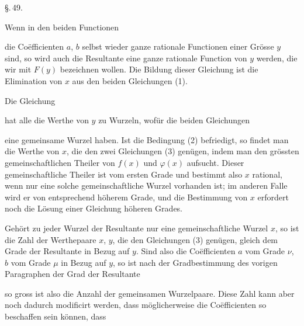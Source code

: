 
\begin{center}
\S.\,49.

\end{center}

Wenn in den beiden Functionen


die Coëfficienten $a$, $b$ selbst wieder ganze rationale Functionen
einer Grösse $y$ sind, so wird auch die Resultante eine ganze
rationale Function von $y$ werden, die wir mit $F(y)$ bezeichnen
wollen. Die Bildung dieser Gleichung ist die Elimination von
$x$ aus den beiden Gleichungen (1).

Die Gleichung


hat alle die Werthe von $y$ zu Wurzeln, wofür die beiden
Gleichungen


eine gemeinsame Wurzel haben. Ist die Bedingung (2) befriedigt,
so findet man die Werthe von $x$, die den zwei Gleichungen
(3) genügen, indem man den grössten gemeinschaftlichen Theiler
von $f(x)$ und $\varphi(x)$ aufsucht. Dieser gemeinschaftliche Theiler
ist vom ersten Grade und bestimmt also $x$ rational, wenn
nur eine solche gemeinschaftliche Wurzel vorhanden ist; im anderen
 Falle wird er von entsprechend höherem Grade, und die
Bestimmung von $x$ erfordert noch die Lösung einer Gleichung
höheren Grades.

Gehört zu jeder Wurzel der Resultante nur eine gemeinschaftliche
 Wurzel $x$, so ist die Zahl der Werthepaare $x$, $y$, die
den Gleichungen (3) genügen, gleich dem Grade der Resultante
in Bezug auf $y$. Sind also die Coëfficienten $a$ vom Grade $\nu$, $b$
vom Grade $\mu$ in Bezug auf $y$, so ist nach der Gradbestimmung
des vorigen Paragraphen der Grad der Resultante


so gross ist also die Anzahl der gemeinsamen Wurzelpaare.
Diese Zahl kann aber noch dadurch modificirt werden, dass
möglicherweise die Coëfficienten so beschaffen sein können, dass
